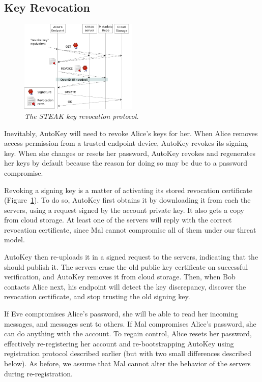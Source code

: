 \subsection{Key Revocation}


\begin{figure}[h!]
\centering
\includegraphics[width=0.5\textwidth]{figures/revoke}
\caption{\it The STEAK key revocation protocol.}
\label{fig:revoke}
\end{figure}

Inevitably, AutoKey will need to revoke Alice’s keys for her.  When Alice removes access permission from a trusted endpoint device, AutoKey revokes its signing key.  When she changes or resets her password, AutoKey revokes and regenerates her keys by default because the reason for doing so may be due to a password compromise.

Revoking a signing key is a matter of activating its stored revocation certificate (Figure~\ref{fig:revoke}).  To do so, AutoKey first obtains it by downloading it from each the servers, using a request signed by the account private key.  It also gets a copy from cloud storage.  At least one of the servers will reply with the correct revocation certificate, since Mal cannot compromise all of them under our threat model.

AutoKey then re-uploads it in a signed request to the servers, indicating that the should publish it.  The servers erase the old public key certificate on successful verification, and AutoKey removes it from cloud storage.  Then, when Bob contacts Alice next, his endpoint will detect the key discrepancy, discover the revocation certificate, and stop trusting the old signing key.

If Eve compromises Alice’s password, she will be able to read her incoming messages, and messages sent to others.  If Mal compromises Alice’s password, she can do anything with the account.  To regain control, Alice resets her password, effectively re-registering her account and re-bootstrapping AutoKey using registration protocol described earlier (but with two small differences described below).  As before, we assume that Mal cannot alter the behavior of the servers during re-registration.

